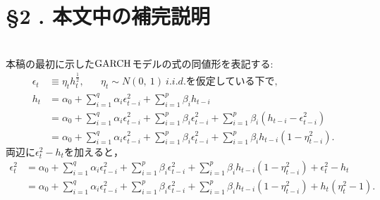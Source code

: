 \documentclass[8pt]{jsarticle}
\newcommand{\Section}[2]{\section*{\S #1 .\hspace{5pt} #2}}
\begin{document}
\Section{2}{本文中の補完説明}

\begin{breakbox}
	{}\\
	本稿の最初に示した${\rm GARCH}$モデルの式の同値形を表記する:
	\begin{align*}
		\epsilon_t &\equiv \eta_t h_t^{\frac{1}{2}}, \hspace{20pt} \eta_t \sim N(0,\ 1)\ i.i.d. \mbox{を仮定している下で,}\\
		h_t &= \alpha_0 + \sum_{i=1}^{q} \alpha_i \epsilon_{t-i}^2 + \sum_{i=1}^{p} \beta_i h_{t-i} \\
		&= \alpha_0 + \sum_{i=1}^{q} \alpha_i \epsilon_{t-i}^2 + \sum_{i=1}^{p} \beta_i \epsilon_{t-i}^2 + \sum_{i=1}^{p} \beta_i (h_{t-i} - \epsilon_{t-i}^2) \\
		&= \alpha_0 + \sum_{i=1}^{q} \alpha_i \epsilon_{t-i}^2 + \sum_{i=1}^{p} \beta_i \epsilon_{t-i}^2 + \sum_{i=1}^{p} \beta_i h_{t-i}(1 - \eta_{t-i}^2).
	\end{align*}
	$両辺に \epsilon_t^2 - h_t を加えると，$
	\begin{align*}
		\epsilon_t^2 &= \alpha_0 + \sum_{i=1}^{q} \alpha_i \epsilon_{t-i}^2 + \sum_{i=1}^{p} \beta_i \epsilon_{t-i}^2 
			+ \sum_{i=1}^{p} \beta_i h_{t-i}(1 - \eta_{t-i}^2) + \epsilon_t^2 - h_t \\
		&= \alpha_0 + \sum_{i=1}^{q} \alpha_i \epsilon_{t-i}^2 + \sum_{i=1}^{p} \beta_i \epsilon_{t-i}^2 
			+ \sum_{i=1}^{p} \beta_i h_{t-i}(1 - \eta_{t-i}^2) + h_t(\eta_t^2 - 1).
	\end{align*}
\end{breakbox}
\end{document}
